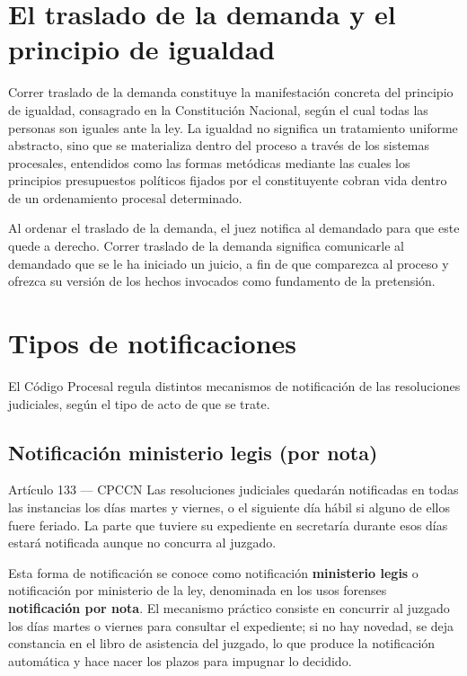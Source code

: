 \documentclass[12pt,oneside]{book}
\begin{document}
\section{El traslado de la demanda y el principio de igualdad}

Correr traslado de la demanda constituye la manifestación concreta del principio de igualdad, consagrado en la Constitución Nacional, según el cual todas las personas son iguales ante la ley. La igualdad no significa un tratamiento uniforme abstracto, sino que se materializa dentro del proceso a través de los sistemas procesales, entendidos como las formas metódicas mediante las cuales los principios \textemdash{}presupuestos políticos fijados por el constituyente\textemdash{} cobran vida dentro de un ordenamiento procesal determinado.

\begin{important}
Al ordenar el traslado de la demanda, el juez notifica al demandado para que este quede a derecho. Correr traslado de la demanda significa comunicarle al demandado que se le ha iniciado un juicio, a fin de que comparezca al proceso y ofrezca su versión de los hechos invocados como fundamento de la pretensión.
\end{important}

\section{Tipos de notificaciones}

El Código Procesal regula distintos mecanismos de notificación de las resoluciones judiciales, según el tipo de acto de que se trate.

\subsection{Notificación ministerio legis (por nota)}

\begin{definition}{Artículo 133 --- CPCCN}
Las resoluciones judiciales quedarán notificadas en todas las instancias los días martes y viernes, o el siguiente día hábil si alguno de ellos fuere feriado. La parte que tuviere su expediente en secretaría durante esos días estará notificada aunque no concurra al juzgado.
\end{definition}

Esta forma de notificación se conoce como notificación \textbf{ministerio legis} o notificación por ministerio de la ley, denominada en los usos forenses \textbf{notificación por nota}. El mecanismo práctico consiste en concurrir al juzgado los días martes o viernes para consultar el expediente; si no hay novedad, se deja constancia en el libro de asistencia del juzgado, lo que produce la notificación automática y hace nacer los plazos para impugnar lo decidido.
\end{document}
